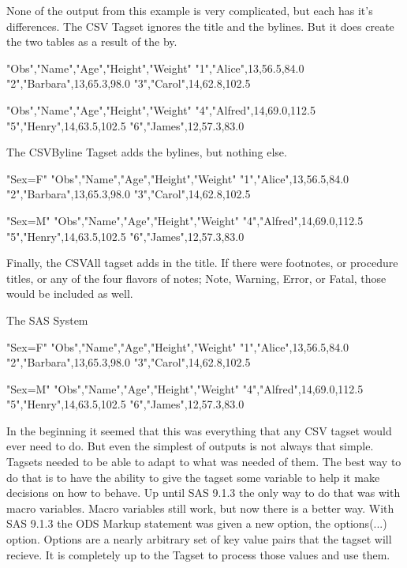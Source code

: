 None of the output from this example is very complicated,
but each has it's differences.  The CSV Tagset ignores the title
and the bylines. But it does create the two tables as a result of
the by.

\begin{sfvoutput}
"Obs","Name","Age","Height","Weight"
"1","Alice",13,56.5,84.0
"2","Barbara",13,65.3,98.0
"3","Carol",14,62.8,102.5

"Obs","Name","Age","Height","Weight"
"4","Alfred",14,69.0,112.5
"5","Henry",14,63.5,102.5
"6","James",12,57.3,83.0
\end{sfvoutput}

The CSVByline Tagset adds the bylines, but nothing else.

\begin{sfvoutput}
"Sex=F"
"Obs","Name","Age","Height","Weight"
"1","Alice",13,56.5,84.0
"2","Barbara",13,65.3,98.0
"3","Carol",14,62.8,102.5

"Sex=M"
"Obs","Name","Age","Height","Weight"
"4","Alfred",14,69.0,112.5
"5","Henry",14,63.5,102.5
"6","James",12,57.3,83.0
\end{sfvoutput}

Finally, the CSVAll tagset adds in the title.  If there were
footnotes, or procedure titles, or any of the four flavors of
notes; Note, Warning, Error, or Fatal, those would be included as well.

\begin{sfvoutput}
The SAS System

"Sex=F"
"Obs","Name","Age","Height","Weight"
"1","Alice",13,56.5,84.0
"2","Barbara",13,65.3,98.0
"3","Carol",14,62.8,102.5

"Sex=M"
"Obs","Name","Age","Height","Weight"
"4","Alfred",14,69.0,112.5
"5","Henry",14,63.5,102.5
"6","James",12,57.3,83.0
\end{sfvoutput}

In the beginning it seemed that this was everything that any CSV tagset
would ever need to do.  But even the simplest of outputs is not always 
that simple.  Tagsets needed to be able to adapt to what was needed of them.
The best way to do that is to have the ability to give the tagset some variable
to help it make decisions on how to behave.  Up until SAS 9.1.3 the only way
to do that was with macro variables.  Macro variables still work, but now there
is a better way.  With SAS 9.1.3 the ODS Markup statement was given a new option,
the options(...) option.  Options are a nearly arbitrary set of key value pairs
that the tagset will recieve.  It is completely up to the Tagset to process those
values and use them. 

